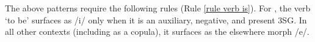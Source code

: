 				
				
		

The above patterns require the following rules (Rule \ref{rule verb is}). For {\seaSE}, the verb `to be' surfaces as /{i}/ only when it is an auxiliary, negative, and present 3SG. In all other contexts (including as a copula), it surfaces as the elsewhere morph /{e}/.

